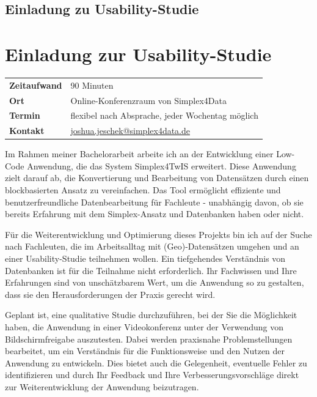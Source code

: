 \ifdefined\STANDALONE
  \section*{Einladung zu Usability-Studie}
\else
  \chapter{Einladung zur Usability-Studie}
  \label{app:invitation}
\fi

\begin{tabular}{ l l }
  \textbf{Zeitaufwand} & 90 Minuten                                                                   \\
  \textbf{Ort}         & Online-Konferenzraum von Simplex4Data                                        \\
  \textbf{Termin}      & flexibel nach Absprache, jeder Wochentag möglich                             \\
  \textbf{Kontakt}     & \href{mailto:joshua.jeschek@simplex4data.de}{joshua.jeschek@simplex4data.de}
\end{tabular}

\vspace{2\baselineskip}

\noindent
Im Rahmen meiner Bachelorarbeit arbeite ich an der Entwicklung einer Low-Code Anwendung, die das System Simplex4TwIS erweitert. Diese Anwendung zielt darauf ab, die Konvertierung und Bearbeitung von Datensätzen durch einen blockbasierten Ansatz zu vereinfachen. Das Tool ermöglicht effiziente und benutzerfreundliche Datenbearbeitung für Fachleute - unabhängig davon, ob sie bereits Erfahrung mit dem Simplex-Ansatz und Datenbanken haben oder nicht.

Für die Weiterentwicklung und Optimierung dieses Projekts bin ich auf der Suche nach Fachleuten, die im Arbeitsalltag mit (Geo)-Datensätzen umgehen und an einer Usability-Studie teilnehmen wollen. Ein tiefgehendes Verständnis von Datenbanken ist für die Teilnahme nicht erforderlich. Ihr Fachwissen und Ihre Erfahrungen sind von unschätzbarem Wert, um die Anwendung so zu gestalten, dass sie den Herausforderungen der Praxis gerecht wird.

Geplant ist, eine qualitative Studie durchzuführen, bei der Sie die Möglichkeit haben, die Anwendung in einer Videokonferenz unter der Verwendung von Bildschirmfreigabe auszutesten. Dabei werden praxisnahe Problemstellungen bearbeitet, um ein Verständnis für die Funktionsweise und den Nutzen der Anwendung zu entwickeln. Dies bietet auch die Gelegenheit, eventuelle Fehler zu identifizieren und durch Ihr Feedback und Ihre Verbesserungsvorschläge direkt zur Weiterentwicklung der Anwendung beizutragen.


